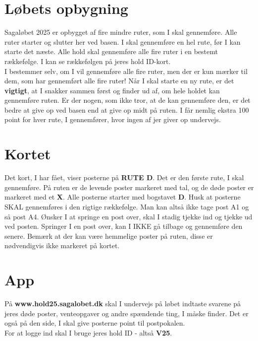 \section{Løbets opbygning}
Sagaløbet 2025 er opbygget af fire mindre ruter, som I skal gennemføre. Alle ruter starter og slutter her ved basen. I skal gennemføre en hel rute, før I kan starte det næste. Alle hold skal gennemføre alle fire ruter i en bestemt rækkefølge. I kan se rækkefølgen på jeres hold ID-kort.\\\newline
I bestemmer selv, om I vil gennemføre alle fire ruter, men der er kun mærker til dem, som har gennemført alle fire ruter! Når I skal starte en ny rute, er det \textbf{vigtigt}, at I snakker sammen først og finder ud af, om hele holdet kan gennemføre ruten. Er der nogen, som ikke tror, at de kan gennemføre den, er det bedre at give op ved basen end at give op midt på ruten. I får nemlig ekstra 100 point for hver rute, I gennemfører, hvor ingen af jer giver op undervejs.\\
\section{Kortet}
Det kort, I har fået, viser posterne på \textbf{RUTE D}. Det er den første rute, I skal gennemføre. På ruten er de levende poster markeret med tal, og de døde poster er markeret med et \textbf{X}. Alle posterne starter med bogstavet \textbf{D}. Husk at posterne SKAL gennemføres i den rigtige rækkefølge. Man kan altså ikke tage post A1 og så post A4. Ønsker I at springe en post over, skal I stadig tjekke ind og tjekke ud ved posten. Springer I en post over, kan I IKKE gå tilbage og gennemføre den senere. Bemærk at der kan være hemmelige poster på ruten, disse er nødvendigvis ikke markeret på kortet.
\section{App}
På \textbf{www.hold25.sagalobet.dk} skal I undervejs på løbet indtaste svarene på jeres døde poster, venteopgaver og andre spændende ting, I måske finder. Det er også på den side, I skal give posterne point til postpokalen.\\
For at logge ind skal I bruge jeres hold ID - altså \textbf{V25}.
\newpage
